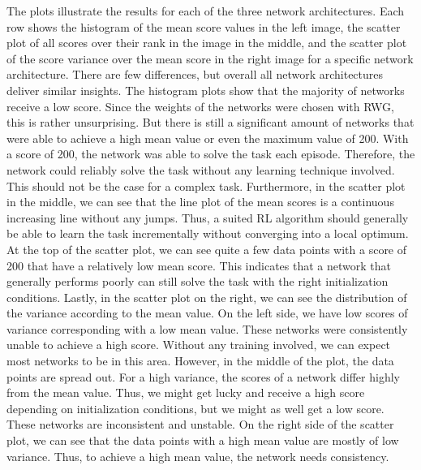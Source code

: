 The plots illustrate the results for each of the three network architectures. Each row shows the histogram of the mean score values in the left image, the scatter plot of all scores over their rank in the image in the middle, and the scatter plot of the score variance over the mean score in the right image for a specific network architecture. There are few differences, but overall all network architectures deliver similar insights. The histogram plots show that the majority of networks receive a low score. Since the weights of the networks were chosen with RWG, this is rather unsurprising. But there is still a significant amount of networks that were able to achieve a high mean value or even the maximum value of 200. With a score of 200, the network was able to solve the task each episode. Therefore, the network could reliably solve the task without any learning technique involved. This should not be the case for a complex task. Furthermore, in the scatter plot in the middle, we can see that the line plot of the mean scores is a continuous increasing line without any jumps. Thus, a suited RL algorithm should generally be able to learn the task incrementally without converging into a local optimum. At the top of the scatter plot, we can see quite a few data points with a score of 200 that have a relatively low mean score. This indicates that a network that generally performs poorly can still solve the task with the right initialization conditions. Lastly, in the scatter plot on the right, we can see the distribution of the variance according to the mean value. On the left side, we have low scores of variance corresponding with a low mean value. These networks were consistently unable to achieve a high score. Without any training involved, we can expect most networks to be in this area. However, in the middle of the plot, the data points are spread out. For a high variance, the scores of a network differ highly from the mean value. Thus, we might get lucky and receive a high score depending on initialization conditions, but we might as well get a low score. These networks are inconsistent and unstable. On the right side of the scatter plot, we can see that the data points with a high mean value are mostly of low variance. Thus, to achieve a high mean value, the network needs consistency.

